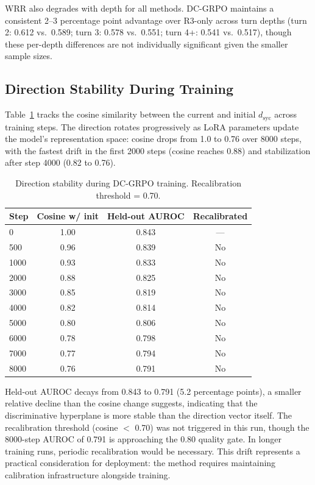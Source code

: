 \documentclass[11pt,a4paper]{article}
\newcommand{\dsyc}{$d_{\text{syc}}$}
\begin{document}
WRR also degrades with depth for all methods. DC-GRPO maintains a consistent 2--3 percentage point advantage over R3-only across turn depths (turn 2: 0.612 vs.\ 0.589; turn 3: 0.578 vs.\ 0.551; turn 4+: 0.541 vs.\ 0.517), though these per-depth differences are not individually significant given the smaller sample sizes.

\subsection{Direction Stability During Training}
\label{sec:stability}

Table~\ref{tab:stability} tracks the cosine similarity between the current and initial \dsyc{} across training steps. The direction rotates progressively as LoRA parameters update the model's representation space: cosine drops from 1.0 to 0.76 over 8000 steps, with the fastest drift in the first 2000 steps (cosine reaches 0.88) and stabilization after step 4000 (0.82 to 0.76).

\begin{table}[t]
\centering
\caption{Direction stability during DC-GRPO training. Recalibration threshold = 0.70.}
\label{tab:stability}
\small
\begin{tabular}{lccc}
\toprule
Step & Cosine w/ init & Held-out AUROC & Recalibrated \\
\midrule
0    & 1.00 & 0.843 & --- \\
500  & 0.96 & 0.839 & No \\
1000 & 0.93 & 0.833 & No \\
2000 & 0.88 & 0.825 & No \\
3000 & 0.85 & 0.819 & No \\
4000 & 0.82 & 0.814 & No \\
5000 & 0.80 & 0.806 & No \\
6000 & 0.78 & 0.798 & No \\
7000 & 0.77 & 0.794 & No \\
8000 & 0.76 & 0.791 & No \\
\bottomrule
\end{tabular}
\end{table}

Held-out AUROC decays from 0.843 to 0.791 (5.2 percentage points), a smaller relative decline than the cosine change suggests, indicating that the discriminative hyperplane is more stable than the direction vector itself. The recalibration threshold (cosine $<$ 0.70) was not triggered in this run, though the 8000-step AUROC of 0.791 is approaching the 0.80 quality gate. In longer training runs, periodic recalibration would be necessary. This drift represents a practical consideration for deployment: the method requires maintaining calibration infrastructure alongside training.
\end{document}
